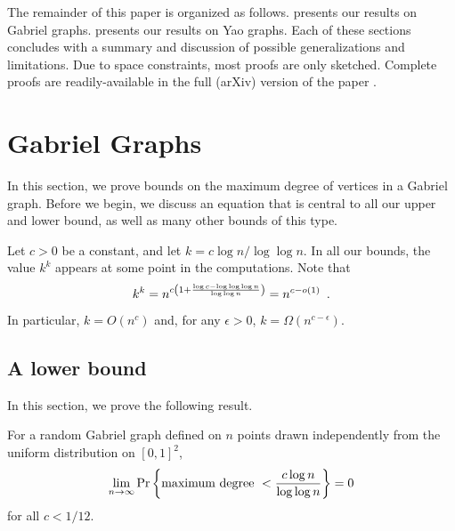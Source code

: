 \documentclass[10pt]{llncs}
\newcommand{\PROB}{\Pr}
\begin{document}
The remainder of this paper is organized as follows.  
presents our results on Gabriel graphs.   presents our results
on Yao graphs.  Each of these sections concludes with a summary and
discussion of possible generalizations and limitations.  Due to space
constraints, most proofs are only sketched. Complete proofs are
readily-available in the full (arXiv) version of the paper \cite{dgm09}.

\section{Gabriel Graphs}


In this section, we prove bounds on the maximum degree of vertices in a
Gabriel graph.  Before we begin, we discuss an equation that is central to
all our upper and lower bound, as well as many other bounds of this type.

Let $c>0$ be a constant, and let $k=c\log n/\log\log n$.  In all our
bounds, the value $k^k$ appears at some point in the computations.  Note that
\begin{equation}
    k^k = n^{c\left(1+\frac{\log c - \log\log\log n}{\log\log n}\right)} = n^{c-o(1)}
   \enspace . \eqlabel{central}
\end{equation}
In particular, $k=O(n^c)$ and, for any $\epsilon >0$,
$k=\Omega(n^{c-\epsilon})$.  


\subsection{A lower bound}

In this section, we prove the following result.

\begin{thm}
For a random Gabriel graph defined on $n$ points drawn
independently from the uniform distribution on
$[0,1]^2$, 
\[
\lim_{n\to\infty} \PROB \left\{ \hbox{\rm maximum degree}~< {c \log n \over
\log \log n} \right\} = 0
\]
for all $c < 1/12$.
\end{thm}
\end{document}

